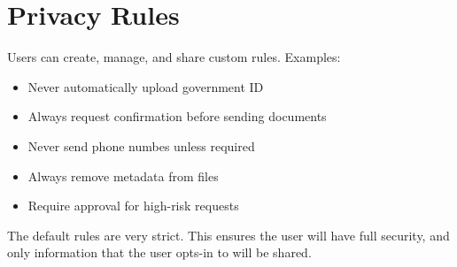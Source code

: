 
\chapter{Privacy Rules}
Users can create, manage, and share custom rules.
Examples:
\begin{itemize}
	\item Never automatically upload government ID
	\item Always request confirmation before sending documents
	\item Never send phone numbes unless required
	\item Always remove metadata from files
	\item Require approval for high-risk requests
\end{itemize}

The default rules are very strict. This ensures the user will have full security, and only information that the user opts-in to will be shared.

\sentinelchapterend
